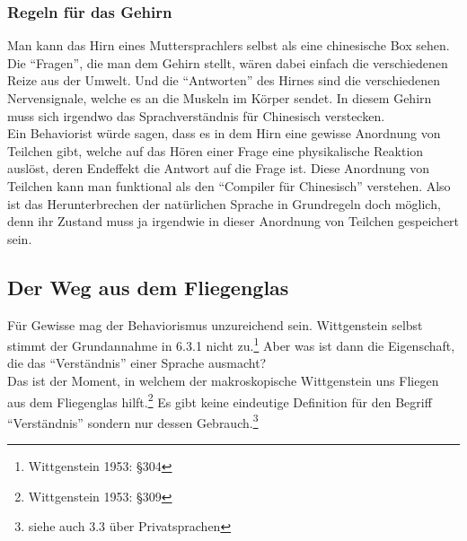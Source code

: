 \documentclass[10pt,a4paper]{article}
\begin{document}
\subsubsection{Regeln für das Gehirn}
Man kann das Hirn eines Muttersprachlers selbst als eine chinesische Box sehen. Die \enquote{Fragen}, die man dem Gehirn stellt, wären dabei einfach die verschiedenen Reize aus der Umwelt. Und die \enquote{Antworten} des Hirnes sind die verschiedenen Nervensignale, welche es an die Muskeln im Körper sendet. In diesem Gehirn muss sich irgendwo das Sprachverständnis für Chinesisch verstecken. \\
Ein Behaviorist würde sagen, dass es in dem Hirn eine gewisse Anordnung von Teilchen gibt, welche auf das Hören einer Frage eine physikalische Reaktion auslöst, deren Endeffekt die Antwort auf die Frage ist. Diese Anordnung von Teilchen kann man funktional als den \enquote{Compiler für Chinesisch} verstehen. Also ist das Herunterbrechen der natürlichen Sprache in Grundregeln doch möglich, denn ihr Zustand muss ja irgendwie in dieser Anordnung von Teilchen gespeichert sein.

\subsection{Der Weg aus dem Fliegenglas}
Für Gewisse mag der Behaviorismus unzureichend sein. Wittgenstein selbst stimmt der Grundannahme in 6.3.1 nicht zu.\footnote{Wittgenstein 1953: §304} Aber was ist dann die Eigenschaft, die das \enquote{Verständnis} einer Sprache ausmacht? \\
Das ist der Moment, in welchem der makroskopische Wittgenstein uns Fliegen aus dem Fliegenglas hilft.\footnote{Wittgenstein 1953: §309} Es gibt keine eindeutige Definition für den Begriff \enquote{Verständnis} sondern nur dessen Gebrauch.\footnote{siehe auch 3.3 über Privatsprachen}
\end{document}
